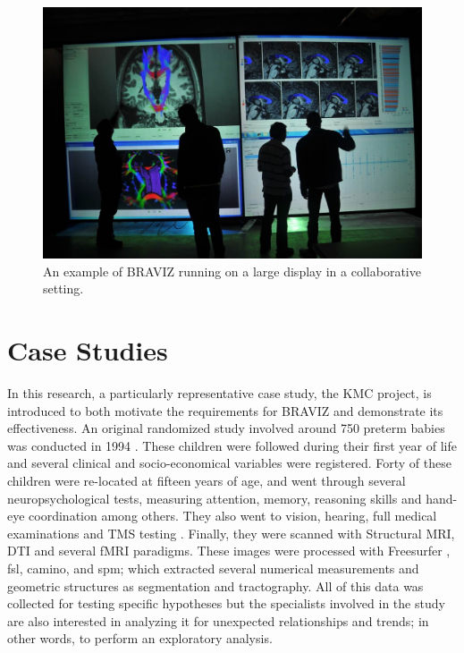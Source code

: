 \documentclass[twocolumn]{svjour3}
\begin{document}
\begin{figure}
\begin{center}
\includegraphics[width=\linewidth]{figures/imagine.jpg}
\end{center}
 \caption{\label{fig_imagine} An example of BRAVIZ running on a large display in a collaborative setting.}
\end{figure}

\section{Case Studies}

In this research, a particularly representative case study, the KMC project, is introduced to both motivate the requirements for BRAVIZ and demonstrate its effectiveness. An original randomized study involved around 750 preterm babies was conducted in 1994 \cite{charpak_kangaroo_1997}. These children were followed during their first year \cite{charpak_randomized_2001}\cite{tessier_kangaroo_2009} of life and several clinical and socio-economical variables were registered. Forty of these children were re-located at fifteen years of age, and went through several neuropsychological tests, measuring attention, memory, reasoning skills and hand-eye coordination among others. They also went to vision, hearing, full medical examinations and TMS testing \cite{schneider_cerebral_2012}. Finally, they were scanned with Structural MRI, DTI and several fMRI paradigms. These images were processed with Freesurfer \cite{fischl_freesurfer_2012}, fsl\cite{jenkinson_fsl_2012}, camino\cite{cook_camino:_2006}, and spm\cite{friston_statistical_2006}; which extracted several numerical measurements and geometric structures as segmentation and tractography. All of this data was collected for testing specific hypotheses but the specialists involved in the study are also interested in analyzing it for unexpected relationships and trends; in other words, to perform an exploratory analysis.
\end{document}
